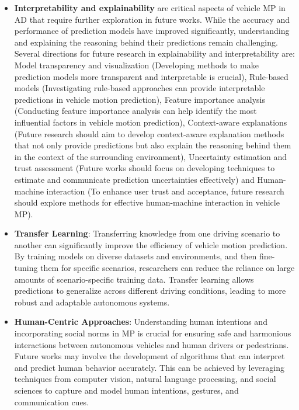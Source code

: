 \begin{itemize}
	\item \textbf{Interpretability and explainability} are critical aspects of vehicle \ac{MP} \cite{hussain2021explainable} \cite{albrecht2021interpretable} \cite{hu2019multi} in \ac{AD} that require further exploration in future works. While the accuracy and performance of prediction models have improved significantly, understanding and explaining the reasoning behind their predictions remain challenging. Several directions for future research in explainability and interpretability are: Model transparency and visualization (Developing methods to make prediction models more transparent and interpretable is crucial), Rule-based models (Investigating rule-based approaches can provide interpretable predictions in vehicle motion prediction), Feature importance analysis (Conducting feature importance analysis can help identify the most influential factors in vehicle motion prediction), Context-aware explanations (Future research should aim to develop context-aware explanation methods that not only provide predictions but also explain the reasoning behind them in the context of the surrounding environment), Uncertainty estimation and trust assessment (Future works should focus on developing techniques to estimate and communicate prediction uncertainties effectively) and Human-machine interaction (To enhance user trust and acceptance, future research should explore methods for effective human-machine interaction in vehicle \ac{MP}).
	
	\item \textbf{Transfer Learning}: Transferring knowledge from one driving scenario to another can significantly improve the efficiency of vehicle motion prediction. By training models on diverse datasets and environments, and then fine-tuning them for specific scenarios, researchers can reduce the reliance on large amounts of scenario-specific training data. Transfer learning allows predictions to generalize across different driving conditions, leading to more robust and adaptable autonomous systems.
	
	\item \textbf{Human-Centric Approaches}: Understanding human intentions and incorporating social norms in \ac{MP} is crucial for ensuring safe and harmonious interactions between autonomous vehicles and human drivers or pedestrians. Future works may involve the development of algorithms that can interpret and predict human behavior accurately. This can be achieved by leveraging techniques from computer vision, natural language processing, and social sciences to capture and model human intentions, gestures, and communication cues.
	

\end{itemize}
